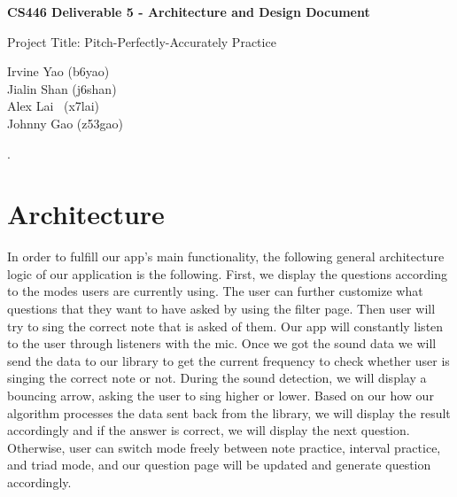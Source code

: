 \documentclass{article}
\begin{document}
\begin{titlepage}
   \vspace*{100px}
  \begin{center}

    \Large\textbf{CS446 Deliverable 5 - Architecture and Design Document}

   \vspace{50px}

    \Large{Project Title: Pitch-Perfectly-Accurately Practice}

   \vspace{50px}

    \large{Irvine Yao (b6yao)\\Jialin Shan (j6shan)\\Alex Lai \ (x7lai)\\Johnny Gao (z53gao)}

  \end{center}
\end{titlepage}
  
.


\section{Architecture}
\label{sec:architecture}
\large
\qquad

In order to fulfill our app’s main functionality, the following general architecture logic of our application is the following. First, we display the questions according to the modes users are currently using. The user can further customize what questions that they want to have asked by using the filter page. Then user will try to sing the correct note that is asked of them. Our app will constantly listen to the user through listeners with the mic. Once we got the sound data we will send the data to our library to get the current frequency to check whether user is singing the correct note or not. During the sound detection, we will display a bouncing arrow, asking the user to sing higher or lower. Based on our how our algorithm processes the data sent back from the library, we will display the result accordingly and if the answer is correct, we will display the next question. Otherwise, user can switch mode freely between note practice, interval practice, and triad mode, and our question page will be updated and generate question accordingly. 
\end{document}
